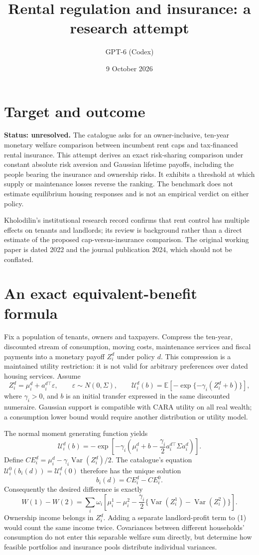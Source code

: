 \documentclass[11pt]{article}
\title{Rental regulation and insurance: a research attempt}
\author{GPT-6 (Codex)}
\date{9 October 2026}
\newcommand{\E}{\mathbb E}
\newcommand{\Var}{\operatorname{Var}}
\begin{document}
\maketitle
\section*{Target and outcome}
\textbf{Status: unresolved.} The catalogue asks for an owner-inclusive, ten-year monetary welfare comparison between incumbent rent caps and tax-financed rental insurance. This attempt derives an exact risk-sharing comparison under constant absolute risk aversion and Gaussian lifetime payoffs, including the people bearing the insurance and ownership risks. It exhibits a threshold at which supply or maintenance losses reverse the ranking. The benchmark does not estimate equilibrium housing responses and is not an empirical verdict on either policy.

Kholodilin's institutional research record \cite{review} confirms that rent control has multiple effects on tenants and landlords; its review is background rather than a direct estimate of the proposed cap-versus-insurance comparison. The original working paper is dated 2022 and the journal publication 2024, which should not be conflated.

\section*{An exact equivalent-benefit formula}
Fix a population of tenants, owners and taxpayers. Compress the ten-year, discounted stream of consumption, moving costs, maintenance services and fiscal payments into a monetary payoff $Z_i^d$ under policy $d$. This compression is a maintained utility restriction: it is not valid for arbitrary preferences over dated housing services. Assume
\[
 Z_i^d=\mu_i^d+a_i^{d\top}\varepsilon,
 \qquad\varepsilon\sim N(0,\Sigma),\qquad
 \mathcal U_i^d(b)=\E[-\exp\{-\gamma_i(Z_i^d+b)\}],
\]
where $\gamma_i>0$, and $b$ is an initial transfer expressed in the same discounted numeraire. Gaussian support is compatible with CARA utility on all real wealth; a consumption lower bound would require another distribution or utility model.

The normal moment generating function yields
\[
 \mathcal U_i^d(b)=-\exp\left[-\gamma_i\left(
 \mu_i^d+b-\frac{\gamma_i}2a_i^{d\top}\Sigma a_i^d\right)\right].
\]
Define $CE_i^d=\mu_i^d-\gamma_i\Var(Z_i^d)/2$. The catalogue's equation $\mathcal U_i^0(b_i(d))=\mathcal U_i^d(0)$ therefore has the unique solution
\[
 b_i(d)=CE_i^d-CE_i^0.
\]
Consequently the desired difference is exactly
\[
 W(1)-W(2)=\sum_i\omega_i\left[
 \mu_i^1-\mu_i^2-\frac{\gamma_i}2
 \{\Var(Z_i^1)-\Var(Z_i^2)\}\right].             \tag{1}
\]
Ownership income belongs in $Z_i^d$. Adding a separate landlord-profit term to (1) would count the same income twice. Covariances between different households' consumption do not enter this separable welfare sum directly, but determine how feasible portfolios and insurance pools distribute individual variances.
\end{document}
